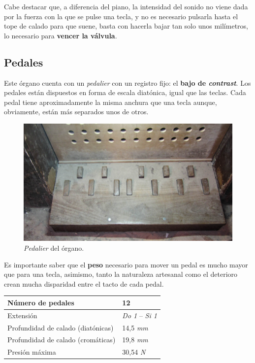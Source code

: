 \smallskip

Cabe destacar que, a diferencia del piano, la intensidad del sonido no viene dada por la fuerza con la que se pulse una tecla, y no es necesario pulsarla hasta el tope de calado para que suene, basta con hacerla bajar tan solo unos milímetros, lo necesario para \textbf{vencer la válvula}.

\subsection{Pedales}

Este órgano cuenta con un \textit{pedalier} con un registro fijo: el \textbf{bajo de \textit{contrast}}. Los pedales están dispuestos en forma de escala diatónica, igual que las teclas. Cada pedal tiene aproximadamente la misma anchura que una tecla aunque, obviamente, están más separados unos de otros.

\smallskip

\begin{figure}[H]
	\noindent \begin{centering}
		\includegraphics[width=\linewidth*3/4]{capitulo3/pedalier}
		\par\end{centering}
	\smallskip
	\caption{\label{fig:pedalier} \textit{Pedalier} del órgano.}
\end{figure} 

\smallskip

Es importante saber que el \textbf{peso} necesario para mover un pedal es mucho mayor que para una tecla, asimismo, tanto la naturaleza artesanal como el deterioro crean mucha disparidad entre el tacto de cada pedal.

\smallskip

\begin{center}
	\begin{tabular}{|l|l|}
		\hline Número de pedales & 12 \\ 
		\hline Extensión & \textit{Do 1} -- \textit{Si 1} \\ 
		\hline Profundidad de calado (diatónicas) & 14,5 \textit{mm} \\ 
		\hline Profundidad de calado (cromáticas) & 19,8 \textit{mm} \\
		\hline Presión máxima & 30,54 \textit{N} \\
		\hline 
	\end{tabular}
	\smallskip
\end{center}

